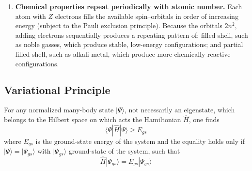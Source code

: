 \documentclass[../../../main.tex]{subfiles}
\begin{document}
\begin{enumerate}
        Hamiltonian possesses degenerate eigenstates labeled by the same principal quantum number $n$ and that these degenerate orbitals form a shell.
        The experimental data suggest that the true number of electrons in each experimental shell are $(2, 8, 8, 18, 18, 32, \ldots)$ instead of the predicted $(2,8,18,32,\ldots)$.
        This reflects subshell energy splitting caused by electron–electron interaction which is ignored in this consideration.

  \item \textbf{Chemical properties repeat periodically with atomic number.}
        Each atom with $Z$ electrons fills the available spin–orbitals in order of increasing energy (subject to the Pauli exclusion principle).
        Because the orbitals $2n^2 $, adding electrons sequentially produces a repeating pattern of:   filled shell, such as noble gasses, which produce stable, low-energy configurations; and partial filled shell, such as alkali metal, which produce more chemically reactive configurations.
\end{enumerate}

\subsection{Variational Principle}
For any normalized many-body state $|\Psi\rangle$, not necessarily an eigenstate, which belongs to the Hilbert space on which acts the Hamiltonian $\hat{H}$, one finds
\begin{equation*}
  \langle \Psi | \hat{H} | \Psi \rangle \geq E_{gs}
\end{equation*}
where $E_{gs}$ is the ground-state energy of the system and the equality holds only if $|\Psi\rangle = |\Psi_{gs}\rangle$ with $|\Psi_{gs}\rangle$ ground-state of the system, such that
\begin{equation*}
  \hat{H} |\Psi_{gs}\rangle = E_{gs} |\Psi_{gs}\rangle
\end{equation*}
\end{document}
